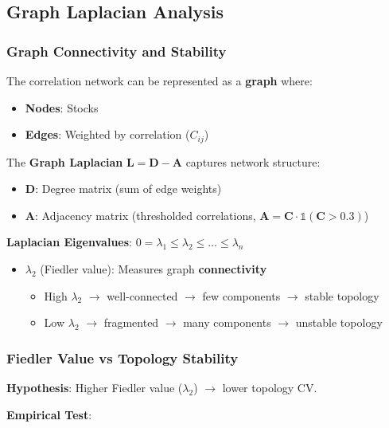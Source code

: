 \subsection{Graph Laplacian Analysis}

\subsubsection{Graph Connectivity and Stability}

The correlation network can be represented as a \textbf{graph} where:
\begin{itemize}
\item \textbf{Nodes}: Stocks
\item \textbf{Edges}: Weighted by correlation ($C_{ij}$)
\end{itemize}

The \textbf{Graph Laplacian} $\mathbf{L} = \mathbf{D} - \mathbf{A}$ captures network structure:
\begin{itemize}
\item $\mathbf{D}$: Degree matrix (sum of edge weights)
\item $\mathbf{A}$: Adjacency matrix (thresholded correlations, $\mathbf{A} = \mathbf{C} \cdot \mathbb{1}(\mathbf{C} > 0.3)$)
\end{itemize}

\textbf{Laplacian Eigenvalues}: $0 = \lambda_1 \leq \lambda_2 \leq \ldots \leq \lambda_n$

\begin{itemize}
\item $\lambda_2$ (Fiedler value): Measures graph \textbf{connectivity}
  \begin{itemize}
  \item High $\lambda_2$ $\rightarrow$ well-connected $\rightarrow$ few components $\rightarrow$ stable topology
  \item Low $\lambda_2$ $\rightarrow$ fragmented $\rightarrow$ many components $\rightarrow$ unstable topology
  \end{itemize}
\end{itemize}

\subsubsection{Fiedler Value vs Topology Stability}

\textbf{Hypothesis}: Higher Fiedler value ($\lambda_2$) $\rightarrow$ lower topology CV.

\textbf{Empirical Test}:

